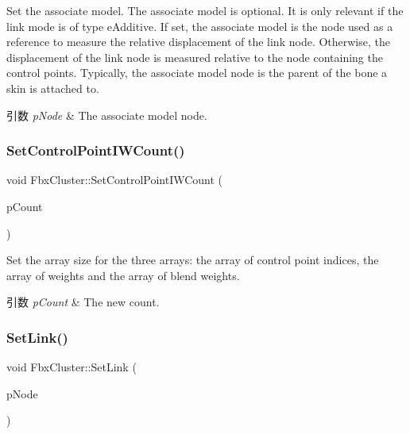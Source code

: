 Set the associate model. The associate model is optional. It is only relevant if the link mode is of type e\+Additive. If set, the associate model is the node used as a reference to measure the relative displacement of the link node. Otherwise, the displacement of the link node is measured relative to the node containing the control points. Typically, the associate model node is the parent of the bone a skin is attached to. 
\begin{DoxyParams}{引数}
{\em p\+Node} & The associate model node. \\
\hline
\end{DoxyParams}
\mbox{\label{class_fbx_cluster_a4772d095f168a919e12b03598219cf05}} 
\subsubsection{\texorpdfstring{Set\+Control\+Point\+I\+W\+Count()}{SetControlPointIWCount()}}
{\footnotesize\ttfamily void Fbx\+Cluster\+::\+Set\+Control\+Point\+I\+W\+Count (\begin{DoxyParamCaption}\item[{int}]{p\+Count }\end{DoxyParamCaption})}

Set the array size for the three arrays\+: the array of control point indices, the array of weights and the array of blend weights. 
\begin{DoxyParams}{引数}
{\em p\+Count} & The new count. \\
\hline
\end{DoxyParams}
\mbox{\label{class_fbx_cluster_ac47ba1185bc9bb341636dbaf43f209ff}} 
\subsubsection{\texorpdfstring{Set\+Link()}{SetLink()}}
{\footnotesize\ttfamily void Fbx\+Cluster\+::\+Set\+Link (\begin{DoxyParamCaption}\item[{const \hyperlink{class_fbx_node}{Fbx\+Node} $\ast$}]{p\+Node }\end{DoxyParamCaption})}

